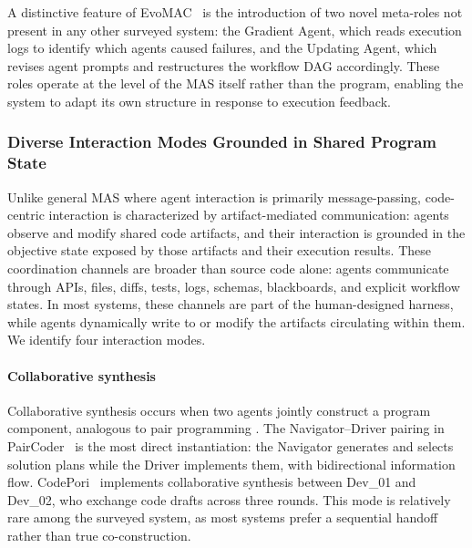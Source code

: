 A distinctive feature of EvoMAC~\cite{Hu2025EvoMAC} is the
introduction of two novel meta-roles not present in any other
surveyed system: the Gradient Agent, which reads execution logs
to identify which agents caused failures, and the Updating Agent,
which revises agent prompts and restructures the workflow DAG
accordingly. These roles operate at the level of the MAS itself
rather than the program, enabling the system to adapt its own
structure in response to execution feedback.


\subsubsection{Diverse Interaction Modes Grounded in Shared Program State}
Unlike general MAS where agent interaction is primarily
message-passing, code-centric interaction is characterized by
artifact-mediated communication: agents observe and modify shared
code artifacts, and their interaction is grounded in the
objective state exposed by those artifacts and their execution
results. {These coordination channels are broader
than source code alone: agents communicate through APIs, files,
diffs, tests, logs, schemas, blackboards, and explicit workflow
states. In most systems, these channels are part of the
human-designed harness, while agents dynamically write to or
modify the artifacts circulating within them.} We identify four
interaction modes.

\paragraph{Collaborative synthesis} Collaborative synthesis occurs
when two agents jointly construct a program component, analogous
to pair programming \cite{zou2026recursivemas}. The Navigator--Driver pairing in
PairCoder~\cite{Zhang2024PairProgramming} is the most direct
instantiation: the Navigator generates and selects solution plans
while the Driver implements them, with bidirectional information
flow. CodePori~\cite{Rasheed2024Codepori} implements
collaborative synthesis between Dev\_01 and Dev\_02, who exchange
code drafts across three rounds. This mode is relatively rare among the surveyed system, as most systems prefer a sequential handoff
rather than true co-construction.

